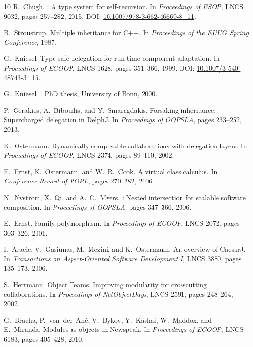 \documentclass[sigplan,10pt,review,anonymous]{acmart}
\theoremstyle{acmplain}
\begin{document}
\begin{thebibliography}{10}
R.~Chugh.
: A type system for self-recursion.
\newblock In {\em Proceedings of ESOP}, LNCS 9032, pages 257--282, 2015.
\newblock DOI: \href{https://doi.org/10.1007/978-3-662-46669-8_11}{10.1007/978-3-662-46669-8\_11}.

B.~Stroustrup.
\newblock Multiple inheritance for {C++}.
\newblock In {\em Proceedings of the EUUG Spring Conference}, 1987.

G.~Kniesel.
\newblock Type-safe delegation for run-time component adaptation.
\newblock In {\em Proceedings of ECOOP}, LNCS 1628, pages 351--366, 1999.
\newblock DOI: \href{https://doi.org/10.1007/3-540-48743-3_16}{10.1007/3-540-48743-3\_16}.

G.~Kniesel.
.
\newblock PhD thesis, University of Bonn, 2000.

P.~Gerakios, A.~Biboudis, and Y.~Smaragdakis.
\newblock Forsaking inheritance: Supercharged delegation in {DelphJ}.
\newblock In {\em Proceedings of OOPSLA}, pages 233--252, 2013.

K.~Ostermann.
\newblock Dynamically composable collaborations with delegation layers.
\newblock In {\em Proceedings of ECOOP}, LNCS 2374, pages 89--110, 2002.

E.~Ernst, K.~Ostermann, and W.~R.~Cook.
\newblock A virtual class calculus.
\newblock In {\em Conference Record of POPL}, pages 270--282, 2006.

N.~Nystrom, X.~Qi, and A.~C.~Myers.
: Nested intersection for scalable software composition.
\newblock In {\em Proceedings of OOPSLA}, pages 347--366, 2006.

E.~Ernst.
\newblock Family polymorphism.
\newblock In {\em Proceedings of ECOOP}, LNCS 2072, pages 303--326, 2001.

I.~Aracic, V.~Gasiunas, M.~Mezini, and K.~Ostermann.
\newblock An overview of {CaesarJ}.
\newblock In {\em Transactions on Aspect-Oriented Software Development I}, LNCS 3880, pages 135--173, 2006.

S.~Herrmann.
\newblock Object {Teams}: Improving modularity for crosscutting collaborations.
\newblock In {\em Proceedings of NetObjectDays}, LNCS 2591, pages 248--264, 2002.

G.~Bracha, P.~von~der~Ah{\'e}, V.~Bykov, Y.~Kashai, W.~Maddox, and E.~Miranda.
\newblock Modules as objects in {Newspeak}.
\newblock In {\em Proceedings of ECOOP}, LNCS 6183, pages 405--428, 2010.


\end{thebibliography}
\end{document}

